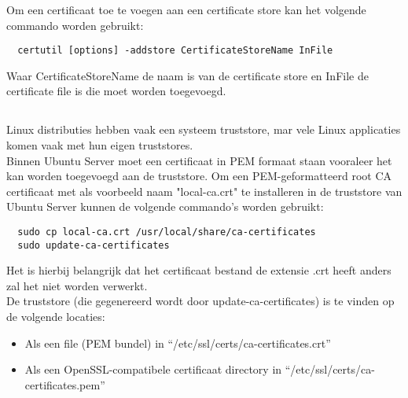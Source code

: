 Om een certificaat toe te voegen aan een certificate store kan het volgende commando worden gebruikt:
\begin{verbatim}
  certutil [options] -addstore CertificateStoreName InFile
\end{verbatim}
Waar CertificateStoreName de naam is van de certificate store en InFile de certificate file is die moet worden toegevoegd. \autocite{MScertutil} \\

\subsection{}
\label{subsec:Ubuntu_truststore}

Linux distributies hebben vaak een systeem truststore, mar vele Linux applicaties komen vaak met hun eigen truststores. \\

Binnen Ubuntu Server moet een certificaat in PEM formaat staan vooraleer het kan worden toegevoegd aan de truststore.
Om een PEM-geformatteerd root CA certificaat met als voorbeeld naam "local-ca.crt" te installeren in de truststore van Ubuntu Server kunnen de volgende commando's worden gebruikt:
\begin{verbatim}
  sudo cp local-ca.crt /usr/local/share/ca-certificates
  sudo update-ca-certificates
\end{verbatim}

Het is hierbij belangrijk dat het certificaat bestand de extensie .crt heeft anders zal het niet worden verwerkt. \\

De truststore (die gegenereerd wordt door update-ca-certificates) is te vinden op de volgende locaties:
\begin{itemize}
  \item Als een file (PEM bundel) in ``/etc/ssl/certs/ca-certificates.crt''
  \item Als een OpenSSL-compatibele certificaat directory in ``/etc/ssl/certs/ca-certificates.pem''
\end{itemize} \autocite{UbunTruststore}
\\

\subsection{}
\label{subsec:RHEL_truststore}

